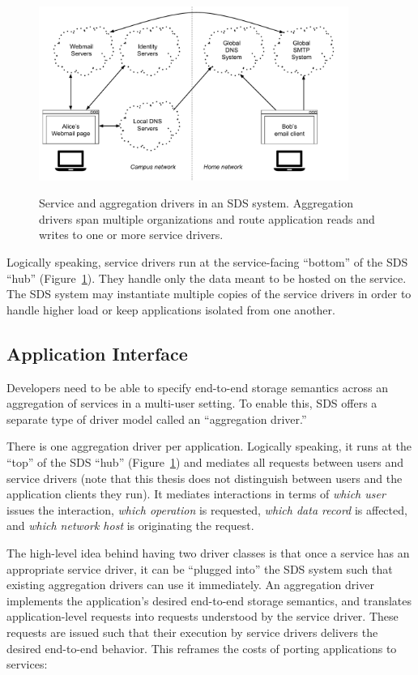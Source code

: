 \begin{figure}[h]
   \caption{Service and aggregation drivers in an SDS system.  Aggregation
   drivers span multiple organizations and route application reads and writes to
   one or more service drivers.}
   \centering
   \includegraphics[width=0.9\textwidth,page=3]{figures/dissertation-figures}
   \label{fig:chap2-driver-overview}
\end{figure}

Logically speaking, service drivers run at the service-facing ``bottom'' of the
SDS ``hub'' (Figure~\ref{fig:chap2-driver-overview}).
They handle only the data meant to be hosted on the service.  The SDS system may
instantiate multiple copies of the service drivers in order to handle higher
load or keep applications isolated from one another.

\subsection{Application Interface}

Developers need to be able to specify
end-to-end storage semantics across an aggregation of services
in a multi-user setting.  To enable this,
SDS offers a separate type of driver model called an ``aggregation
driver.''

There is one aggregation driver per application.  Logically speaking, it runs at
the ``top'' of the SDS ``hub'' (Figure~\ref{fig:chap2-driver-overview})
and mediates all requests between users and
service drivers (note that this thesis does not
distinguish between users and the application clients
they run).  It mediates interactions in terms of \emph{which user} issues the
interaction, \emph{which operation} is requested, \emph{which data
record} is affected, and \emph{which network host} is originating the request.

The high-level idea behind having two driver classes is that once a service has an appropriate service driver,
it can be ``plugged into'' the SDS system such that existing aggregation drivers
can use it immediately.  An aggregation driver implements the application's desired end-to-end storage
semantics, and translates
application-level requests into requests understood by the service driver.  These
requests are issued such that their execution
by service drivers delivers the desired end-to-end behavior.  This reframes the
costs of porting applications to services:

